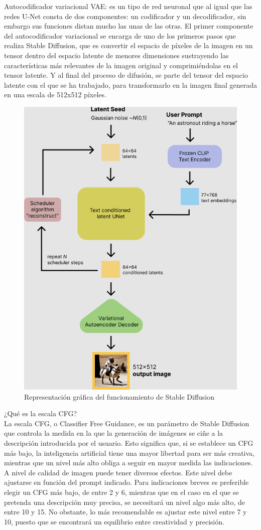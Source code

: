 Autocodificador variacional VAE: es un tipo de red neuronal que al igual que las redes U-Net consta de dos componentes: un codificador y un decodificador, sin embargo sus funciones distan mucho las unas de las otras. El primer componente del autocodificador variacional se encarga de uno de los primeros pasos que realiza Stable Diffusion, que es convertir el espacio de píxeles de la imagen en un tensor dentro del espacio latente de menores dimensiones sustrayendo las características más relevantes de la imagen original y comprimiéndolas en el tensor latente. Y al final del proceso de difusión, se parte del tensor del espacio latente con el que se ha trabajado, para transformarlo en la imagen final generada en una escala de 512x512 píxeles.\\
\begin{figure}[h]
	\centering
	\includegraphics[width = 0.4
	\textwidth]{Imagenes/Vectorial/representacionvisualSD.png}
	\caption{Representación gráfica del funcionamiento de Stable Diffusion}
	\label{fig:sampleImage}
\end{figure}


¿Qué es la escala CFG?\\

La escala CFG, o Classifier Free Guidance, es un parámetro de Stable Diffusion que controla la medida en la que la generación de imágenes se ciñe a la descripción introducida por el usuario. Esto significa que, si se establece un CFG más bajo, la inteligencia artificial tiene una mayor libertad para ser más creativa, mientras que un nivel más alto obliga a seguir en mayor medida las indicaciones.\\

A nivel de calidad de imagen puede tener diversos efectos. Este nivel debe ajustarse en función del prompt indicado. Para indicaciones breves es preferible elegir un CFG más bajo, de entre 2 y 6, mientras que en el caso en el que se pretenda una descripción muy precisa, se necesitará un nivel algo más alto, de entre 10 y 15. No obstante, lo más recomendable es ajustar este nivel entre 7 y 10, puesto que se encontrará un equilibrio entre creatividad y precisión.\\

